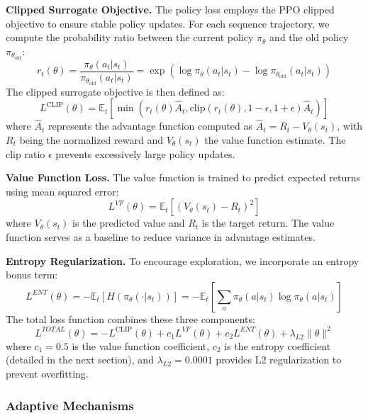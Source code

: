 \documentclass[conference]{IEEEtran}
\begin{document}
\textbf{Clipped Surrogate Objective.} The policy loss employs the PPO clipped objective to ensure stable policy updates. For each sequence trajectory, we compute the probability ratio between the current policy $\pi_{\theta}$ and the old policy $\pi_{\theta_{\text{old}}}$:
%
\begin{equation}
r_t(\theta) = \frac{\pi_{\theta}(a_t|s_t)}{\pi_{\theta_{\text{old}}}(a_t|s_t)} = \exp(\log \pi_{\theta}(a_t|s_t) - \log \pi_{\theta_{\text{old}}}(a_t|s_t))
\end{equation}
%
The clipped surrogate objective is then defined as:
%
\begin{equation}
L^{\text{CLIP}}(\theta) = \mathbb{E}_t\left[\min\left(r_t(\theta)\hat{A}_t, \text{clip}(r_t(\theta), 1-\epsilon, 1+\epsilon)\hat{A}_t\right)\right]
\end{equation}
%
where $\hat{A}_t$ represents the advantage function computed as $\hat{A}_t = R_t - V_{\theta}(s_t)$, with $R_t$ being the normalized reward and $V_{\theta}(s_t)$ the value function estimate. The clip ratio $\epsilon$ prevents excessively large policy updates.

\textbf{Value Function Loss.} The value function is trained to predict expected returns using mean squared error:
%
\begin{equation}
L^{VF}(\theta) = \mathbb{E}_t\left[\left(V_{\theta}(s_t) - R_t\right)^2\right]
\end{equation}
%
where $V_{\theta}(s_t)$ is the predicted value and $R_t$ is the target return. The value function serves as a baseline to reduce variance in advantage estimates.

\textbf{Entropy Regularization.} To encourage exploration, we incorporate an entropy bonus term:
%
\begin{equation}
L^{ENT}(\theta) = -\mathbb{E}_t\left[H(\pi_{\theta}(\cdot|s_t))\right] = -\mathbb{E}_t\left[\sum_{a} \pi_{\theta}(a|s_t)\log \pi_{\theta}(a|s_t)\right]
\end{equation}
%
The total loss function combines these three components:
%
\begin{equation}
L^{TOTAL}(\theta) = -L^{\text{CLIP}}(\theta) + c_1 L^{VF}(\theta) + c_2 L^{ENT}(\theta) + \lambda_{L2}\|\theta\|^2
\end{equation}
%
where $c_1 = 0.5$ is the value function coefficient, $c_2$ is the entropy coefficient (detailed in the next section), and $\lambda_{L2} = 0.0001$ provides L2 regularization to prevent overfitting.

\subsubsection{Adaptive Mechanisms}
\end{document}
